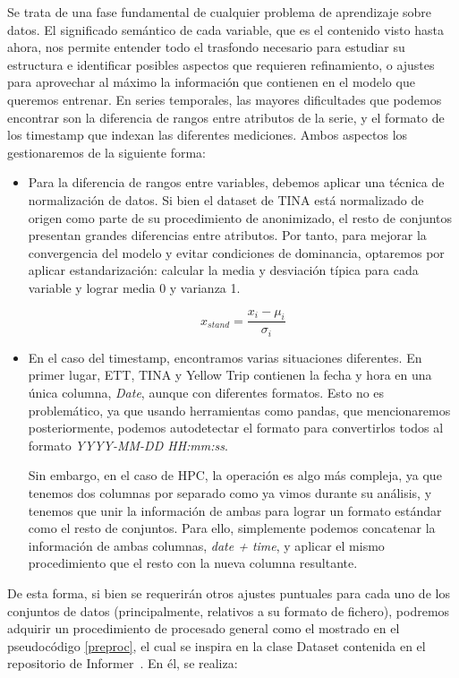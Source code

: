Se trata de una fase fundamental de cualquier problema de aprendizaje sobre datos. El significado semántico de cada variable, que es el contenido visto hasta ahora, nos permite entender todo el trasfondo necesario para estudiar su estructura e identificar posibles aspectos que requieren refinamiento, o ajustes para aprovechar al máximo la información que contienen en el modelo que queremos entrenar. En series temporales, las mayores dificultades que podemos encontrar son la diferencia de rangos entre atributos de la serie, y el formato de los timestamp que indexan las diferentes mediciones. Ambos aspectos los gestionaremos de la siguiente forma:

\begin{itemize}
	\item Para la diferencia de rangos entre variables, debemos aplicar una técnica de normalización de datos. Si bien el dataset de TINA está normalizado de origen como parte de su procedimiento de anonimizado, el resto de conjuntos presentan grandes diferencias entre atributos. Por tanto, para mejorar la convergencia del modelo y evitar condiciones de dominancia, optaremos por aplicar estandarización: calcular la media y desviación típica para cada variable y lograr media 0 y varianza 1.
	
	$$x_{stand} = \frac{x_i - \mu_i}{\sigma_i}$$
	\item En el caso del timestamp, encontramos varias situaciones diferentes. En primer lugar, ETT, TINA y Yellow Trip contienen la fecha y hora en una única columna, \textit{Date}, aunque con diferentes formatos. Esto no es problemático, ya que usando herramientas como pandas, que mencionaremos posteriormente, podemos autodetectar el formato para convertirlos todos al formato \textit{YYYY-MM-DD HH:mm:ss}.
	
	Sin embargo, en el caso de HPC, la operación es algo más compleja, ya que tenemos dos columnas por separado como ya vimos durante su análisis, y tenemos que unir la información de ambas para lograr un formato estándar como el resto de conjuntos. Para ello, simplemente podemos concatenar la información de ambas columnas, \textit{date + time}, y aplicar el mismo procedimiento que el resto con la nueva columna resultante.
\end{itemize}

De esta forma, si bien se requerirán otros ajustes puntuales para cada uno de los conjuntos de datos (principalmente, relativos a su formato de fichero), podremos adquirir un procedimiento de procesado general como el mostrado en el pseudocódigo \ref{preproc}, el cual se inspira en la clase Dataset contenida en el repositorio de Informer~\cite{zhouhaoyi2020informer}. En él, se realiza:

